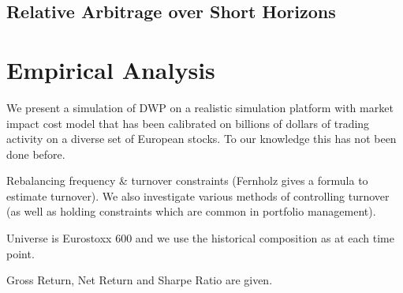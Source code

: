 \documentclass[british]{amsart} \usepackage{lmodern}
\numberwithin{equation}{section} \numberwithin{figure}{section}
\theoremstyle{plain} \newtheorem{thm}{\protect\theoremname}[section]
\theoremstyle{definition} \newtheorem{defn}[thm]{\protect\definitionname}
\theoremstyle{plain} \newtheorem{assumption}[thm]{\protect\assumptionname}
\theoremstyle{plain} \newtheorem{lem}[thm]{\protect\lemmaname}
\theoremstyle{plain} \newtheorem{prop}[thm]{\protect\propositionname}
\theoremstyle{remark} \newtheorem{rem}[thm]{\protect\remarkname}
\theoremstyle{plain} \newtheorem{cor}[thm]{\protect\corollaryname}
\begin{document}
\subsection{Relative Arbitrage over Short Horizons}

\section{Empirical Analysis}

We present a simulation of DWP  on a realistic simulation platform
with market impact cost model that has been calibrated on billions
of dollars of trading activity on a diverse set of European stocks.
To our knowledge this has not been done before. 

Rebalancing frequency \& turnover constraints (Fernholz gives a formula
to estimate turnover). We also investigate various methods of controlling
turnover (as well as holding constraints which are common in portfolio
management).

Universe is Eurostoxx 600 and we use the historical composition as
at each time point.

Gross Return, Net Return and Sharpe Ratio are given.



\printbibliography
\end{document}

